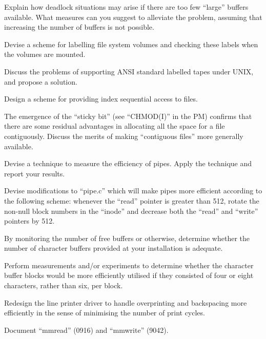 \item[3.5] Explain how deadlock situations may
arise if there are too few ``large''
buffers available. What measures can
you suggest to alleviate the problem,
assuming that increasing the number of
buffers is not possible.
\ed


\bd
\item[4.1] Devise a scheme for labelling file
system volumes and checking these
labels when the volumes are mounted.

\item[4.2] Discuss the problems of supporting
ANSI standard labelled tapes under
UNIX, and propose a solution.

\item[4.3] Design a scheme for providing index
sequential access to files.

\item[4.4] The emergence of the ``sticky bit''
(see ``CHMOD(I)'' in the PM) confirms
that there are some residual advantages
in allocating all the space for a file
contiguously. Discuss the merits of
making ``contiguous files'' more generally available.

\item[4.5] Devise a technique to measure the
efficiency of pipes. Apply the technique and report your results.

\item[4.6] Devise modifications to ``pipe.c''
which will make pipes more efficient
according to the following scheme:
whenever the ``read'' pointer is greater
than 512, rotate the non-null block
numbers in the ``inode'' and decrease
both the ``read'' and ``write'' pointers by
512.

\item[5.1] By monitoring the number of free
buffers or otherwise, determine whether
the number of character buffers provided at your installation is adequate.

\item[5.2] Perform measurements and/or experiments
to determine whether the character buffer
blocks would be more efficiently utilised if they consisted of
four or eight characters, rather than
six, per block.

\item[5.3] Redesign the line printer driver to
handle overprinting and backspacing
more efficiently in the sense of
minimising the number of print cycles.

\item[5.4] Document ``mmread'' (0916) and
``mmwrite'' (9042).
\ed
{}

